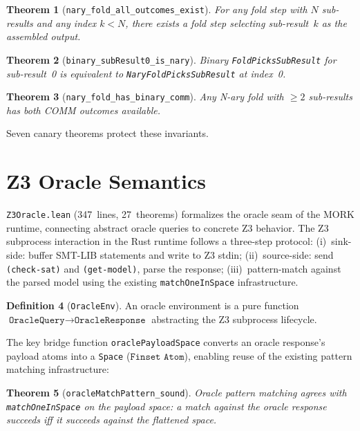 \documentclass[11pt]{article}
\newtheorem{theorem}{Theorem}[section]
\theoremstyle{definition}
\newtheorem{definition}[theorem]{Definition}
\theoremstyle{remark}
\newcommand{\MORK}{\textup{MORK}}
\begin{document}
\begin{theorem}[\texttt{nary\_fold\_all\_outcomes\_exist}]
For any fold step with $N$ sub-results and any index $k < N$, there
exists a fold step selecting sub-result~$k$ as the assembled output.
\end{theorem}

\begin{theorem}[\texttt{binary\_subResult0\_is\_nary}]
Binary \texttt{FoldPicksSubResult} for sub-result~0 is equivalent to
\texttt{NaryFoldPicksSubResult} at index~0.
\end{theorem}

\begin{theorem}[\texttt{nary\_fold\_has\_binary\_comm}]
Any N-ary fold with $\geq 2$ sub-results has both COMM outcomes available.
\end{theorem}

\noindent
Seven canary theorems protect these invariants.

\section{Z3 Oracle Semantics}
\label{sec:z3oracle}

\texttt{Z3Oracle.lean} (347~lines, 27~theorems) formalizes the oracle seam
of the \MORK{} runtime, connecting abstract oracle queries to concrete Z3
behavior.
The Z3 subprocess interaction in the Rust runtime follows a three-step
protocol:
(i)~sink-side: buffer SMT-LIB statements and write to Z3 stdin;
(ii)~source-side: send \texttt{(check-sat)} and \texttt{(get-model)}, parse
the response;
(iii)~pattern-match against the parsed model using the existing
\texttt{matchOneInSpace} infrastructure.

\begin{definition}[\texttt{OracleEnv}]
An oracle environment is a pure function
$\texttt{OracleQuery} \to \texttt{OracleResponse}$
abstracting the Z3 subprocess lifecycle.
\end{definition}

\noindent
The key bridge function \texttt{oraclePayloadSpace} converts an oracle
response's payload atoms into a \texttt{Space} ($\texttt{Finset Atom}$),
enabling reuse of the existing pattern matching infrastructure:

\begin{theorem}[\texttt{oracleMatchPattern\_sound}]
Oracle pattern matching agrees with \texttt{matchOneInSpace} on the
payload space: a match against the oracle response succeeds iff it
succeeds against the flattened space.
\end{theorem}
\end{document}
